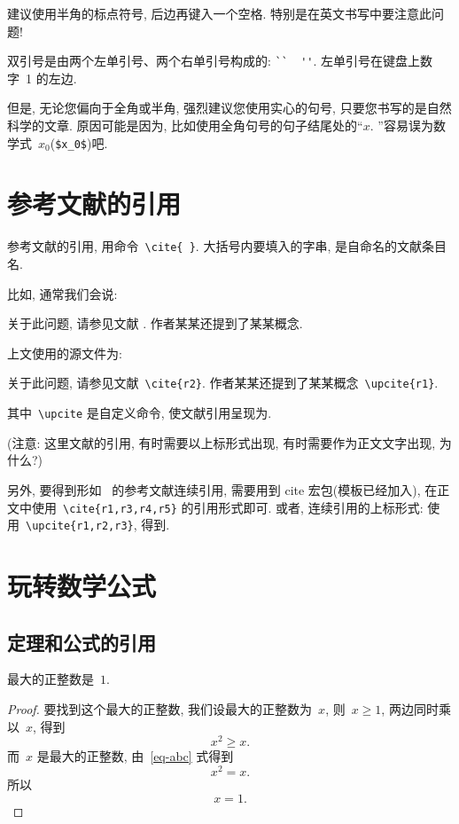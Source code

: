 \documentclass[forprint]{YAUthesis}
\begin{document}
建议使用半角的标点符号, 后边再键入一个空格. 特别是在英文书写中要注意此问题!

双引号是由两个左单引号、两个右单引号构成的: \verb|``  ''|. 左单引号在键盘上数字~1 的左边.

但是, 无论您偏向于全角或半角, 强烈建议您使用实心的句号, 只要您书写的是自然科学的文章.
原因可能是因为, 比如使用全角句号的句子结尾处的``$x$. ''容易误为数学式~$x_0$(\verb|$x_0$|)吧.



\section{参考文献的引用}



参考文献的引用, 用命令~\verb|\cite{ }|. 大括号内要填入的字串, 是自命名的文献条目名.

比如, 通常我们会说:

 {\kaishu
关于此问题, 请参见文献 \cite{r2}. 作者某某还提到了某某概念.}


上文使用的源文件为:

 {\kaishu
关于此问题, 请参见文献~\verb|\cite{r2}|. 作者某某还提到了某某概念~\verb|\upcite{r1}|.
}

其中~\verb|\upcite| 是自定义命令, 使文献引用呈现为.

({\heiti 注意:} {\kaishu 这里文献的引用, 有时需要以上标形式出现, 有时需要作为正文文字出现, 为什么?})

另外, 要得到形如~\cite{r1,r3,r4,r5} 的参考文献连续引用, 需要用到 cite 宏包(模板已经加入),
在正文中使用~\verb|\cite{r1,r3,r4,r5}| 的引用形式即可.
或者, 连续引用的上标形式: 使用~\verb|\upcite{r1,r2,r3}|, 得到.


\section{玩转数学公式}

\subsection{定理和公式的引用}

\begin{theorem}[谁发现的]\label{th-abcd}
最大的正整数是~$1$.
\end{theorem}

\begin{proof}
要找到这个最大的正整数, 我们设最大的正整数为~$x$, 则~$x \geqslant 1$, 两边同时乘以~$x$, 得到
\begin{equation}\label{eq-abc}
x^2 \geqslant x.
\end{equation}
而~$x$ 是最大的正整数, 由~\eqref{eq-abc} 式得到
\[
x^2 = x.
\]
所以
\begin{equation*}
x = 1.
\end{equation*}
\end{proof}
\end{document}
